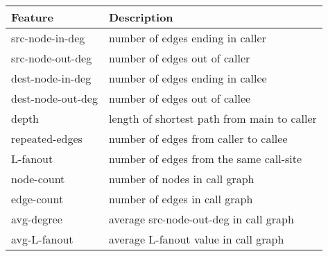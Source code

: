 \begin{tabular}{@{}ll@{}}
\toprule
\textbf{Feature} & \textbf{Description} \\ \midrule
src-node-in-deg & number of edges ending in caller \\
src-node-out-deg & number of edges out of caller \\
dest-node-in-deg & number of edges ending in callee \\
dest-node-out-deg & number of edges out of callee \\
depth & length of shortest path from main to caller \\
repeated-edges & number of edges from caller to callee \\
L-fanout & number of edges from the same call-site \\
node-count & number of nodes in call graph \\
edge-count & number of edges in call graph \\
avg-degree & average src-node-out-deg in call graph \\
avg-L-fanout & average L-fanout value in call graph \\
\bottomrule
\end{tabular}
